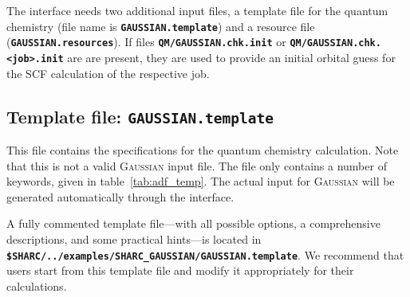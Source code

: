 \documentclass[a4paper,10pt,DIV=15,openany,twoside=false]{scrbook}
\newcommand{\ttt}[1]{\textbf{\texttt{#1}}}
\begin{document}
The interface needs two additional input files, a template file for the quantum chemistry (file name is \ttt{GAUSSIAN.template}) and a resource file (\ttt{GAUSSIAN.resources}). 
If files \ttt{QM/GAUSSIAN.chk.init} or \ttt{QM/GAUSSIAN.chk.<job>.init} are are present, they are used to provide an initial orbital guess for the SCF calculation of the respective job.

\subsection{Template file: \ttt{GAUSSIAN.template}}

This file contains the specifications for the quantum chemistry calculation. Note that this is not a valid \textsc{Gaussian} input file. The file only contains a number of keywords, given in table~\ref{tab:adf_temp}. The actual input for \textsc{Gaussian} will be generated automatically through the interface.

A fully commented template file---with all possible options, a comprehensive descriptions, and some practical hints---is located in \ttt{\$SHARC/../examples/SHARC\_GAUSSIAN/GAUSSIAN.template}.
We recommend that users start from this template file and modify it appropriately for their calculations.
\end{document}
